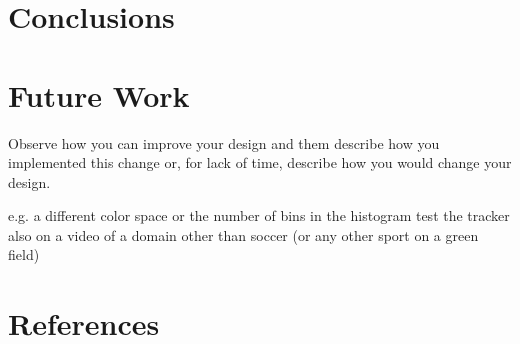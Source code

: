 \documentclass[a4paper,11pt]{article}
\begin{document}
\section{Conclusions} \label{sec:conc}
\section{Future Work} \label{sec:fut}
Observe how you can improve your design and them describe how you implemented this change or, for lack of time, describe how you would change your design. 

e.g. a different color space or the number of bins in the histogram
test the tracker also on a video of a domain other than soccer (or any other sport on a green field)

\section{References} 


% 
% 
\end{document}
